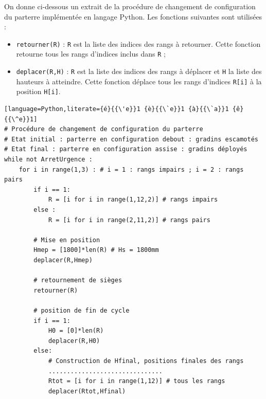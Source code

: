 On donne ci-dessous un extrait de la procédure de changement de configuration du parterre implémentée en langage Python. Les fonctions suivantes sont utilisées :
\begin{itemize}
\item[---] \texttt{retourner(R)} : \texttt{R} est la liste des indices des rangs à retourner. Cette fonction retourne tous les rangs d'indices inclus dans \texttt{R} ;
\item[---] \texttt{deplacer(R,H)} : \texttt{R} est la liste des indices des rangs à déplacer et \texttt{H} la liste des hauteurs à atteindre. Cette fonction déplace tous les rangs d'indices \texttt{R[i]} à la position \texttt{H[i]}.
\end{itemize}

\newpage

\begin{lstlisting}[language=Python,literate={é}{{\'e}}1 {è}{{\`e}}1 {à}{{\`a}}1 {ê}{{\^e}}1]
# Procédure de changement de configuration du parterre
# Etat initial : parterre en configuration debout : gradins escamotés
# Etat final : parterre en configuration assise : gradins déployés
while not ArretUrgence :
    for i in range(1,3) : # i = 1 : rangs impairs ; i = 2 : rangs pairs
        if i == 1:
            R = [i for i in range(1,12,2)] # rangs impairs
        else :
            R = [i for i in range(2,11,2)] # rangs pairs

        # Mise en position
        Hmep = [1800]*len(R) # Hs = 1800mm
        deplacer(R,Hmep)

        # retournement de sièges
        retourner(R)

        # position de fin de cycle
        if i == 1:
            H0 = [0]*len(R)
            deplacer(R,H0)
        else:
            # Construction de Hfinal, positions finales des rangs
            ............................... 
            Rtot = [i for i in range(1,12)] # tous les rangs
            deplacer(Rtot,Hfinal)
\end{lstlisting}



